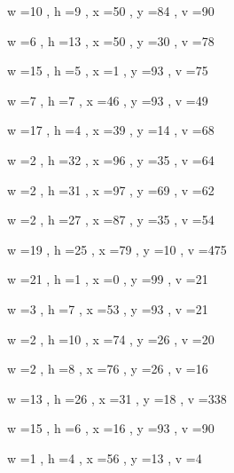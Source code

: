 \documentclass[11pt]{article}
\begin{document}
\par
w =10 , h =9 , x =50 , y =84 , v =90
\par
w =6 , h =13 , x =50 , y =30 , v =78
\par
w =15 , h =5 , x =1 , y =93 , v =75
\par
w =7 , h =7 , x =46 , y =93 , v =49
\par
w =17 , h =4 , x =39 , y =14 , v =68
\par
w =2 , h =32 , x =96 , y =35 , v =64
\par
w =2 , h =31 , x =97 , y =69 , v =62
\par
w =2 , h =27 , x =87 , y =35 , v =54
\par
w =19 , h =25 , x =79 , y =10 , v =475
\par
w =21 , h =1 , x =0 , y =99 , v =21
\par
w =3 , h =7 , x =53 , y =93 , v =21
\par
w =2 , h =10 , x =74 , y =26 , v =20
\par
w =2 , h =8 , x =76 , y =26 , v =16
\par
w =13 , h =26 , x =31 , y =18 , v =338
\par
w =15 , h =6 , x =16 , y =93 , v =90
\par
w =1 , h =4 , x =56 , y =13 , v =4
\par
\newpage
\end{document}
